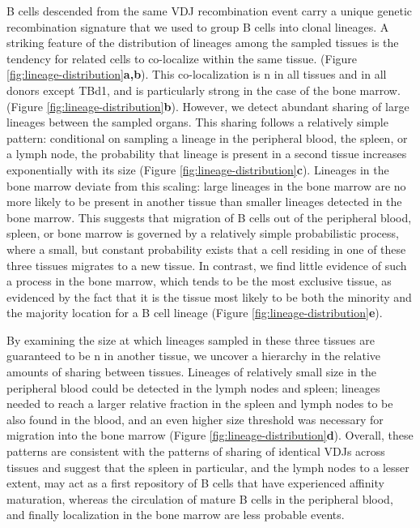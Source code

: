  B cells descended from the same VDJ recombination event carry a unique genetic recombination signature that we used to group B cells into clonal lineages. A striking feature of the distribution of lineages among the sampled tissues is the tendency for related cells to co-localize within the same tissue. (Figure \ref{fig:lineage-distribution}\textbf{a,b}). This co-localization is n in all tissues and in all donors except TBd1, and is particularly strong in the case of the bone marrow. (Figure \ref{fig:lineage-distribution}\textbf{b}).  However, we detect abundant sharing of large lineages between the sampled organs. This sharing follows a relatively simple pattern: conditional on sampling a lineage in the peripheral blood, the spleen, or a lymph node, the probability that lineage is present in a second tissue increases exponentially with its size (Figure \ref{fig:lineage-distribution}\textbf{c}). Lineages in the bone marrow deviate from this scaling: large lineages in the bone marrow are no more likely to be present in another tissue than smaller lineages detected in the bone marrow. This suggests that migration of B cells out of the peripheral blood, spleen, or bone marrow is governed by a relatively simple probabilistic process, where a small, but constant probability exists that a cell residing in one of these three tissues migrates to a new tissue. In contrast, we find little evidence of such a process in the bone marrow, which tends to be the most exclusive tissue, as evidenced by the fact that it is the tissue most likely to be both the minority and the majority location for a B cell lineage (Figure \ref{fig:lineage-distribution}\textbf{e}).

By examining the size at which lineages sampled in these three tissues are guaranteed to be n in another tissue, we uncover a hierarchy in the relative amounts of sharing between tissues. Lineages of relatively small size in the peripheral blood could be detected in the lymph nodes and spleen; lineages needed to reach a larger relative fraction in the spleen and lymph nodes to be also found in the blood, and an even higher size threshold was necessary for migration into the bone marrow (Figure \ref{fig:lineage-distribution}\textbf{d}). Overall, these patterns are consistent with the patterns of sharing of identical VDJs across tissues and suggest that the spleen in particular, and the lymph nodes to a lesser extent, may act as a first repository of B cells that have experienced affinity maturation, whereas the circulation of mature B cells in the peripheral blood, and finally localization in the bone marrow are less probable events.

